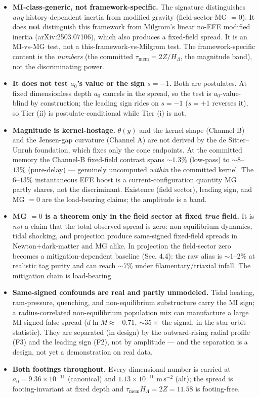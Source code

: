 \documentclass[
]{article}
\providecommand{\tightlist}{%
  \setlength{\itemsep}{0pt}\setlength{\parskip}{0pt}}
\begin{document}
\begin{itemize}
\tightlist
\item
  \textbf{MI-class-generic, not framework-specific.} The signature
  distinguishes \emph{any} history-dependent inertia from modified
  gravity (field-sector MG \(=0\)). It does \textbf{not} distinguish
  this framework from Milgrom's linear no-EFE modified inertia
  (arXiv:2503.07106), which also produces a fixed-field spread. It is an
  MI-vs-MG test, not a this-framework-vs-Milgrom test. The
  framework-specific content is the \emph{numbers} (the committed
  \(\tau_\mathrm{mem}=2Z/H_\Lambda\), the magnitude band), not the
  discriminating power.
\item
  \textbf{It does not test \(a_0\)'s value or the sign \(s=-1\).} Both
  are postulates. At fixed dimensionless depth \(a_0\) cancels in the
  spread, so the test is \(a_0\)-value-blind by construction; the
  leading sign rides on \(s=-1\) (\(s=+1\) reverses it), so Tier (ii) is
  postulate-conditional while Tier (i) is not.
\item
  \textbf{Magnitude is kernel-hostage.} \(\theta(y)\) and the kernel
  shape (Channel B) and the Jensen-gap curvature (Channel A) are not
  derived by the de Sitter--Unruh foundation, which fixes only the cone
  endpoints. At the committed memory the Channel-B fixed-field contrast
  spans \(\sim1.3\%\) (low-pass) to \(\sim8\)--\(13\%\) (pure-delay) ---
  genuinely uncomputed \emph{within} the committed kernel. The
  \(6\)--\(13\%\) instantaneous EFE boost is a current-configuration
  quantity MG partly shares, not the discriminant. Existence (field
  sector), leading sign, and MG \(=0\) are the load-bearing claims; the
  amplitude is a band.
\item
  \textbf{MG \(=0\) is a theorem only in the field sector at fixed
  \emph{true} field.} It is \emph{not} a claim that the total observed
  spread is zero: non-equilibrium dynamics, tidal shocking, and
  projection produce same-signed fixed-field spreads in
  Newton+dark-matter and MG alike. In projection the field-sector zero
  becomes a mitigation-dependent baseline (Sec. 4.4): the raw alias is
  \(\sim1\)--\(2\%\) at realistic tag purity and can reach \(\sim7\%\)
  under filamentary/triaxial infall. The mitigation chain is
  load-bearing.
\item
  \textbf{Same-signed confounds are real and partly unmodeled.} Tidal
  heating, ram-pressure, quenching, and non-equilibrium substructure
  carry the MI sign; a radius-correlated non-equilibrium population mix
  can manufacture a large MI-signed false spread
  (\(d\ln M\approx-0.71\), \(\sim35\times\) the signal, in the
  star-orbit statistic). They are separated (in design) by the
  outward-rising radial profile (F3) and the leading sign (F2), not by
  amplitude --- and the separation is a design, not yet a demonstration
  on real data.
\item
  \textbf{Both footings throughout.} Every dimensional number is carried
  at \(a_0=9.36\times10^{-11}\) (canonical) and
  \(1.13\times10^{-10}\ \mathrm{m\,s^{-2}}\) (alt); the spread is
  footing-invariant at fixed depth and
  \(\tau_\mathrm{mem}H_\Lambda=2Z=11.58\) is footing-free.
\end{itemize}
\end{document}
